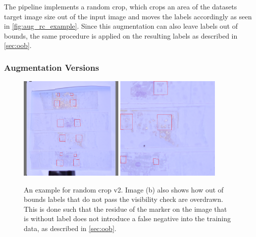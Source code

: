 \documentclass[10pt]{book}
\newcommand{\figureref}[1]{\autoref{#1}}
\begin{document}
The pipeline implements a random crop, which crops an area of the datasets target image size out of the input image and moves the labels accordingly as seen in \figureref{fig:aug_rc_example}. Since this augmentation can also leave labels out of bounds, the same procedure is applied on the resulting labels as described in \autoref{sec:oob}.

\subsubsection{Augmentation Versions}

\begin{figure}
  \centering
     {\includegraphics[width=0.45\textwidth]{image/aug_rc2_before}}
     {\includegraphics[width=0.45\textwidth]{image/aug_rc2_after}}
  \caption{An example for random crop v2. Image (b) also shows how out of bounds labels that do not pass the visibility check are overdrawn. This is done such that the residue of the marker on the image that is without label does not introduce a false negative into the training data, as described in \autoref{sec:oob}.}
  \label{fig:aug_rc2_example}
\end{figure}
\end{document}
